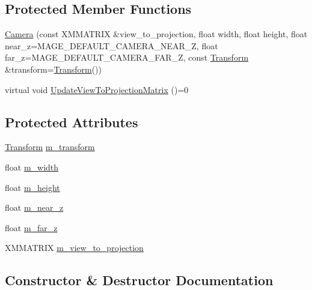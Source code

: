 \subsection*{Protected Member Functions}
\begin{DoxyCompactItemize}
\item 
\hyperlink{classmage_1_1_camera_a21ce33c0d4f4e3fb2cbbd9ba8d024a23}{Camera} (const X\+M\+M\+A\+T\+R\+IX \&view\+\_\+to\+\_\+projection, float width, float height, float near\+\_\+z=M\+A\+G\+E\+\_\+\+D\+E\+F\+A\+U\+L\+T\+\_\+\+C\+A\+M\+E\+R\+A\+\_\+\+N\+E\+A\+R\+\_\+Z, float far\+\_\+z=M\+A\+G\+E\+\_\+\+D\+E\+F\+A\+U\+L\+T\+\_\+\+C\+A\+M\+E\+R\+A\+\_\+\+F\+A\+R\+\_\+Z, const \hyperlink{structmage_1_1_transform}{Transform} \&transform=\hyperlink{structmage_1_1_transform}{Transform}())
\item 
virtual void \hyperlink{classmage_1_1_camera_a7f43b79d363e0c72b0bb42a06b65fb7e}{Update\+View\+To\+Projection\+Matrix} ()=0
\end{DoxyCompactItemize}
\subsection*{Protected Attributes}
\begin{DoxyCompactItemize}
\item 
\hyperlink{structmage_1_1_transform}{Transform} \hyperlink{classmage_1_1_camera_a5f7bd764e2a4a9221bf1f157fa23b3af}{m\+\_\+transform}
\item 
float \hyperlink{classmage_1_1_camera_acc8f371214af02fdac9a1ff04508c4ca}{m\+\_\+width}
\item 
float \hyperlink{classmage_1_1_camera_a48485eca596702f0e5985ec8b7db35a5}{m\+\_\+height}
\item 
float \hyperlink{classmage_1_1_camera_a685f8700a29d1f1eff2bec353c3ec970}{m\+\_\+near\+\_\+z}
\item 
float \hyperlink{classmage_1_1_camera_abe2eeca725ce3da238256007454b241f}{m\+\_\+far\+\_\+z}
\item 
X\+M\+M\+A\+T\+R\+IX \hyperlink{classmage_1_1_camera_a37b814e26a4c733a40a5f6fea691e958}{m\+\_\+view\+\_\+to\+\_\+projection}
\end{DoxyCompactItemize}


\subsection{Constructor \& Destructor Documentation}
\hypertarget{classmage_1_1_camera_ae56c0542ae1a480c7fb15d737bf16de0}{}\label{classmage_1_1_camera_ae56c0542ae1a480c7fb15d737bf16de0} 
